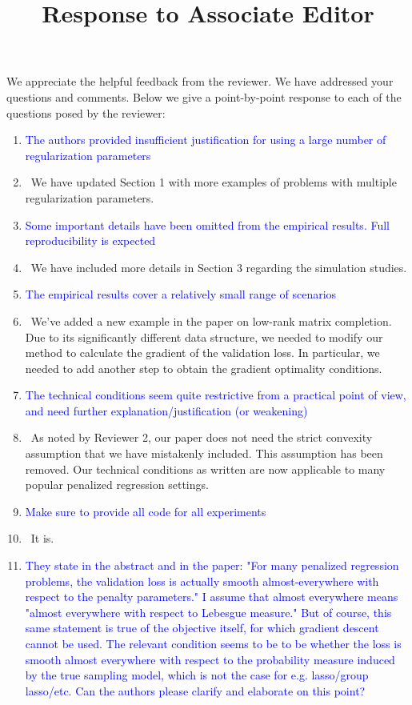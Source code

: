 \documentclass[]{article}
\title{Response to Associate Editor}
\newcommand{\point}[1]{\item \textcolor{blue}{#1}}
\newcommand{\reply}{\item[]\ }
\begin{document}
	\maketitle
		
	We appreciate the helpful feedback from the reviewer. We have addressed your questions and comments. Below we give a point-by-point response to each of the questions posed by the reviewer:
		
	\begin{enumerate}
		\point{The authors provided insufficient justification for using a large number of regularization parameters}
		\reply We have updated Section 1 with more examples of problems with multiple regularization parameters.
		
		\point{Some important details have been omitted from the empirical results. Full reproducibility is expected}
		\reply We have included more details in Section 3 regarding the simulation studies.
		
		\point{The empirical results cover a relatively small range of scenarios}
		\reply We've added a new example in the paper on low-rank matrix completion. Due to its significantly different data structure, we needed to modify our method to calculate the gradient of the validation loss. In particular, we needed to add another step to obtain the gradient optimality conditions.
		
		\point{The technical conditions seem quite restrictive from a practical point of view, and need further explanation/justification (or weakening)}
		\reply As noted by Reviewer 2, our paper does not need the strict convexity assumption that we have mistakenly included. This assumption has been removed. Our technical conditions as written are now applicable to many popular penalized regression settings.
		
		\point{Make sure to provide all code for all experiments}
		\reply It is.
		
		\point{They state in the abstract and in the paper: "For many penalized regression problems, the validation loss is actually smooth almost-everywhere with respect to the penalty parameters."  I assume that almost everywhere means "almost everywhere with respect to Lebesgue measure."  But of course, this same statement is true of the objective itself, for which gradient descent cannot be used.  The relevant condition seems to be to be whether the loss is smooth almost everywhere with respect to the probability measure induced by the true sampling model, which is not the case for e.g. lasso/group lasso/etc.  Can the authors please clarify and elaborate on this point?}
		

\end{enumerate}
\end{document}
